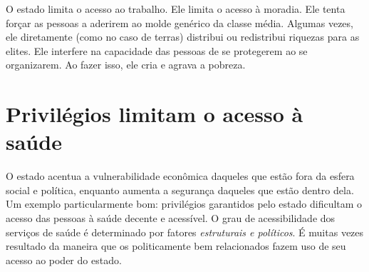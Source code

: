 O estado limita o acesso ao trabalho. Ele limita o acesso à moradia. Ele tenta forçar as pessoas a aderirem ao molde genérico da classe média. Algumas vezes, ele diretamente (como no caso de terras) distribui ou redistribui riquezas para as elites. Ele interfere na capacidade das pessoas de se protegerem ao se organizarem. Ao fazer isso, ele cria e agrava a pobreza.

\section{Privilégios limitam o acesso à saúde}

O estado acentua a vulnerabilidade econômica daqueles que estão fora da esfera social e política, enquanto aumenta a segurança daqueles que estão dentro dela. Um exemplo particularmente bom: privilégios garantidos pelo estado dificultam o acesso das pessoas à saúde decente e acessível. O grau de acessibilidade dos serviços de saúde é determinado por fatores \emph{estruturais e políticos}. É muitas vezes resultado da maneira que os politicamente bem relacionados fazem uso de seu acesso ao poder do estado.

